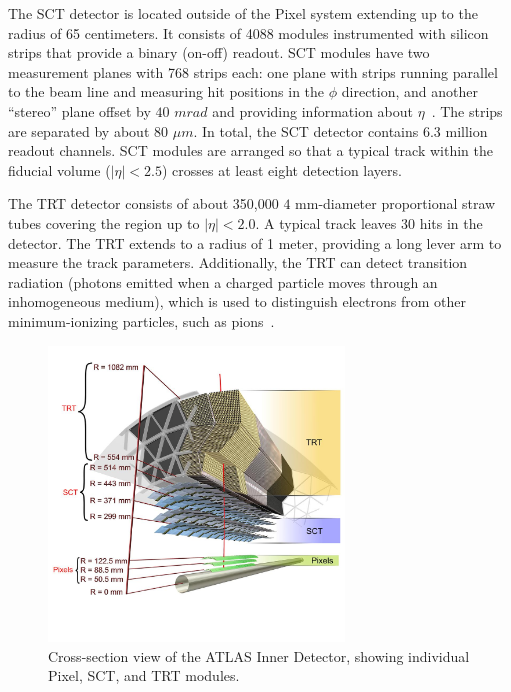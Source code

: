 The SCT detector is located outside of the Pixel system extending up to the radius of 65 centimeters. It consists of 4088 modules instrumented with silicon strips that provide a binary (on-off) readout. SCT modules have two measurement planes with 768 strips each: one plane with strips running parallel to the beam line and measuring hit positions in the $\phi$ direction, and another ``stereo'' plane offset by $40$ $mrad$ and providing information about $\eta$~\cite{1748-0221-3-10-P10006}. The strips are separated by about $80$ $\mu m$. In total, the SCT detector contains 6.3 million readout channels. SCT modules are arranged so that a typical track within the fiducial volume ($|\eta|<2.5$) crosses at least eight detection layers.

The TRT detector consists of about 350,000 $4$ mm-diameter proportional straw tubes covering the region up to $|\eta|<2.0$. A typical track leaves 30 hits in the detector. The TRT extends to a radius of 1 meter, providing a long lever arm to measure the track parameters. Additionally, the TRT can detect transition radiation (photons emitted when a charged particle moves through an inhomogeneous medium), which is used to distinguish electrons from other minimum-ionizing particles, such as pions~\cite{1748-0221-3-02-P02013}.

\begin{figure}[phtb]
  \begin{center}
    \includegraphics[width=0.70\textwidth]{det/fig/indet_xsec}
    \caption{ Cross-section view of the ATLAS Inner Detector, showing individual Pixel, SCT, and TRT modules. }
    \label{fig:det:indet_xsec}
  \end{center}
\end{figure}

